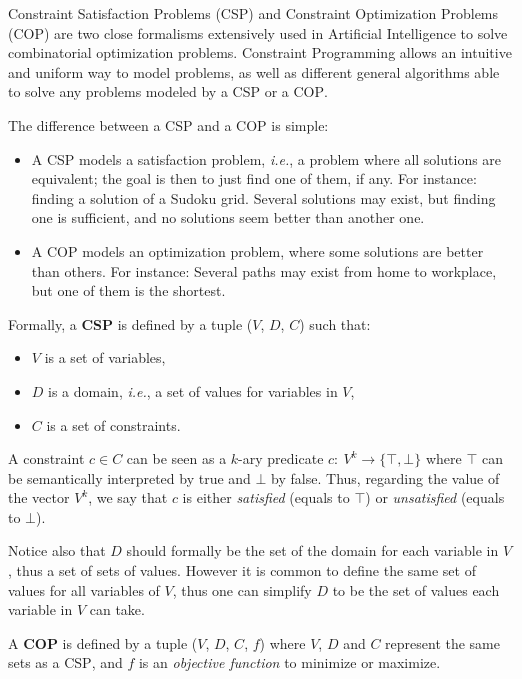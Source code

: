 \documentclass[journal]{IEEEtran}
\newcommand{\csp}{\textsc{CSP}\xspace}
\newcommand{\cop}{\textsc{COP}\xspace}
\newcommand{\ie}{\textit{i.e.}}
\begin{document}
Constraint  Satisfaction Problems  (\csp) and  Constraint Optimization
Problems  (\cop)   are  two  close  formalisms   extensively  used  in
Artificial  Intelligence  to   solve  combinatorial    optimization
problems. Constraint  Programming allows an intuitive  and uniform way
to model  problems, as  well as different  general algorithms able to
solve any problems modeled by a \csp or a \cop.

The difference between a \csp and a \cop is simple:
\begin{itemize}
\item A \csp  models a satisfaction problem, \ie, a  problem where all
  solutions are equivalent; the goal is then to just find one of them,
  if any. For  instance: finding a solution of a  Sudoku grid. Several
  solutions may exist, but finding one is sufficient, and no solutions
  seem better than another one.
\item A \cop models an  optimization problem, where some solutions are
  better than others.  For instance: Several paths may exist from home
  to workplace, but one of them is the shortest.
\end{itemize}
Formally, a {\bf \csp} is defined by a tuple ($V$, $D$, $C$) such that:
\begin{itemize}
\item $V$ is a set of variables,
\item $D$ is a domain, \ie, a set of values for variables in $V$,
\item $C$ is a set of constraints.
\end{itemize}

A  constraint  $c   \in  C$  can  be  seen  as   a  $k$-ary  predicate
$c:~V^k\rightarrow\{\top,\bot\}$  where  $\top$  can  be  semantically
interpreted by true and $\bot$ by  false. Thus, regarding the value of
the vector $V^k$, we say that $c$ is either {\it satisfied} (equals to
$\top$) or {\it unsatisfied} (equals to $\bot$).

Notice also that $D$ should formally be the set of the domain for each
variable in $V$, thus a set of  sets of values. However it is common to
define the same set  of values for all variables of  $V$, thus one can
simplify $D$ to be the set of values each variable in $V$ can take.

A {\bf \cop} is defined by a tuple ($V$, $D$, $C$, $f$) where $V$, $D$ and
$C$ represent the same sets as a \csp, and $f$ is an {\it objective
function} to minimize  or maximize.
\end{document}
